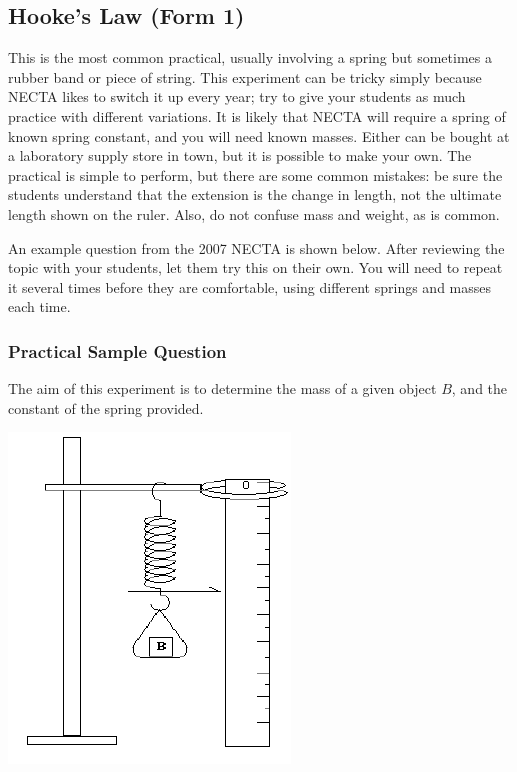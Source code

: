 \subsection{Hooke’s Law (Form 1)}

This is the most common practical, usually involving a spring but sometimes a
rubber band or piece of string. This experiment can be tricky simply because NECTA
likes to switch it up every year; try to give your students as much practice with different
variations. It is likely that NECTA will require a spring of known spring constant, and
you will need known masses. Either can be bought at a laboratory supply store in town,
but it is possible to make your own. The practical is simple to perform, but there are
some common mistakes: be sure the students understand that the extension is the change
in length, not the ultimate length shown on the ruler. Also, do not confuse mass and
weight, as is common.

An example question from the 2007 NECTA is shown below. After reviewing
the topic with your students, let them try this on their own. You will need to repeat it
several times before they are comfortable, using different springs and masses each time.

\subsubsection{Practical Sample Question}

The aim of this experiment is to determine the mass of a given object $B$, and the
constant of the spring provided.

\begin{center}
\includegraphics{./img/spring-practical.png}
\end{center}

